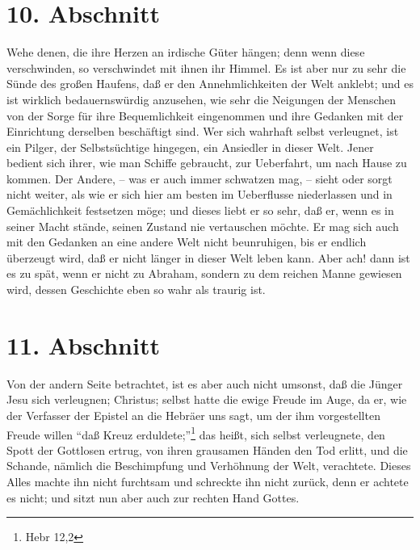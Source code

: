 \section{10. Abschnitt} \label{kap4_ab10}

Wehe denen, die ihre Herzen an irdische Güter hängen; denn wenn diese
verschwinden, so verschwindet mit ihnen ihr Himmel. Es ist aber nur zu sehr die
Sünde des großen Haufens, daß er den Annehmlichkeiten der Welt anklebt; und es
ist wirklich bedauernswürdig anzusehen, wie sehr die Neigungen der Menschen von
der Sorge für ihre Bequemlichkeit eingenommen und ihre Gedanken mit der
Einrichtung derselben beschäftigt sind. Wer sich wahrhaft selbst verleugnet, ist
ein Pilger, der Selbstsüchtige hingegen, ein Ansiedler in dieser Welt. Jener
bedient sich ihrer, wie man Schiffe gebraucht, zur Ueberfahrt, um nach Hause zu
kommen. Der Andere, -- was er auch immer schwatzen mag, -- sieht oder sorgt
nicht weiter, als wie er sich hier am besten im Ueberflusse niederlassen und in
Gemächlichkeit festsetzen möge; und dieses liebt er so sehr, daß er, wenn es in
seiner Macht stände, seinen Zustand nie vertauschen möchte. Er mag sich auch mit
den Gedanken an eine andere Welt nicht beunruhigen, bis er endlich überzeugt
wird, daß er nicht länger in dieser Welt leben kann. Aber ach! dann ist es zu
spät, wenn er nicht zu Abraham, sondern zu dem reichen Manne gewiesen wird,
dessen Geschichte eben so wahr als traurig ist.

\section{11. Abschnitt} \label{kap4_ab11}

Von der andern Seite betrachtet, ist es aber auch nicht umsonst, daß die Jünger
Jesu sich verleugnen; Christus; selbst hatte die ewige Freude im Auge, da er,
wie der Verfasser der Epistel an die Hebräer uns sagt, um der ihm vorgestellten
Freude willen "`daß Kreuz erduldete;"'\footnote{Hebr 12,2} das heißt, sich
selbst verleugnete, den Spott der Gottlosen ertrug, von ihren grausamen Händen
den Tod erlitt, und die Schande, nämlich die Beschimpfung und Verhöhnung der
Welt, verachtete. Dieses Alles machte ihn nicht furchtsam und schreckte ihn
nicht zurück, denn er achtete es nicht; und sitzt nun aber auch zur rechten Hand
Gottes.

